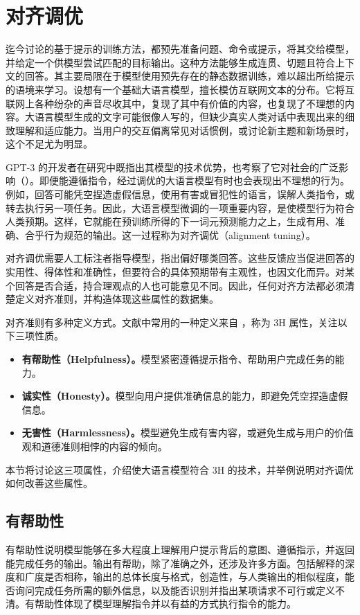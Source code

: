 \section{对齐调优}
\label{sec:ch05-alignment}
迄今讨论的基于提示的训练方法，都预先准备问题、命令或提示，将其交给模型，并给定一个供模型尝试匹配的目标输出。这种方法能够生成连贯、切题且符合上下文的回答。其主要局限在于模型使用预先存在的静态数据训练，难以超出所给提示的语境来学习。设想有一个基础大语言模型，擅长模仿互联网文本的分布。它将互联网上各种纷杂的声音尽收其中，复现了其中有价值的内容，也复现了不理想的内容。大语言模型生成的文字可能很像人写的，但缺少真实人类对话中表现出来的细致理解和适应能力。当用户的交互偏离常见对话惯例，或讨论新主题和新场景时，这个不足尤为明显。

GPT-3 的开发者在研究中既指出其模型的技术优势，也考察了它对社会的广泛影响（）。即便能遵循指令，经过调优的大语言模型有时也会表现出不理想的行为。例如，回答可能凭空捏造虚假信息，使用有害或冒犯性的语言，误解人类指令，或转去执行另一项任务。因此，大语言模型微调的一项重要内容，是使模型行为符合人类预期。这样，它就能在预训练所得的下一词元预测能力之上，生成有用、准确、合乎行为规范的输出。这一过程称为对齐调优（alignment tuning）。

对齐调优需要人工标注者指导模型，指出偏好哪类回答。这些反馈应当促进回答的实用性、得体性和准确性，但要符合的具体预期带有主观性，也因文化而异。对某个回答是否合适，持合理观点的人也可能意见不同。因此，任何对齐方法都必须清楚定义对齐准则，并构造体现这些属性的数据集。

对齐准则有多种定义方式。文献中常用的一种定义来自 ，称为 3H 属性，关注以下三项性质。

\begin{keypoint}
\begin{itemize}
\item \textbf{有帮助性（Helpfulness）。}模型紧密遵循提示指令、帮助用户完成任务的能力。
\item \textbf{诚实性（Honesty）。}模型向用户提供准确信息的能力，即避免凭空捏造虚假信息。
\item \textbf{无害性（Harmlessness）。}模型避免生成有害内容，或避免生成与用户的价值观和道德准则相悖的内容的倾向。
\end{itemize}
\end{keypoint}

本节将讨论这三项属性，介绍使大语言模型符合 3H 的技术，并举例说明对齐调优如何改善这些属性。

\subsection{有帮助性}
有帮助性说明模型能够在多大程度上理解用户提示背后的意图、遵循指示，并返回能完成任务的输出。输出有帮助，除了准确之外，还涉及许多方面。包括解释的深度和广度是否相称，输出的总体长度与格式，创造性，与人类输出的相似程度，能否询问完成任务所需的额外信息，以及能否识别并指出某项请求不可行或定义不清。有帮助性体现了模型理解指令并以有益的方式执行指令的能力。

